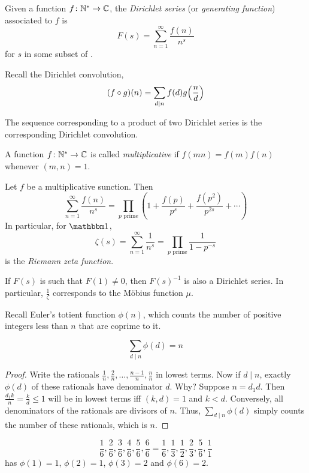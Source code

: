 \begin{definition*} \label{def:dirichlet_series}
    Given a function $f\colon \mathbb{N}^* \to \mathbb{C}$, the \emph{Dirichlet series}
    (or \emph{generating function}) associated to $f$ is \[
        F(s) = \sum_{n=1}^\infty \frac{f(n)}{n^s}
    \] for $s$ in some subset of \C.
\end{definition*}
Recall the Dirichlet convolution, \[
    (f \circ g)(n) = \sum_{d \mid n} f(d)g\paren*[\Big]{\frac{n}{d}}
\]
\begin{exercise}
    The sequence corresponding to a product of two Dirichlet series is the
    corresponding Dirichlet convolution.
\end{exercise}

\begin{definition*}[Multiplicative] \label{def:multiplicative}
    A function $f\colon \mathbb{N}^* \to \mathbb{C}$ is called \emph{multiplicative} if
    $f(mn) = f(m)f(n)$ whenever $(m, n) = 1$.
\end{definition*}
\begin{fact}
    Let $f$ be a multiplicative sunction.
    Then \[
        \sum_{n=1}^\infty \frac{f(n)}{n^s}
        = \prod_{p \text{ prime}} \left(1 + \frac{f(p)}{p^s} + \frac{f(p^2)}{p^{2s}} + \cdots\right)
    \] In particular, for $\mathbbm 1$, \[
        \zeta(s) = \sum_{n=1}^\infty \frac{1}{n^s}
        = \prod_{p \text{ prime}} \frac{1}{1 - p^{-s}}
    \] is the \emph{Riemann zeta function}.
\end{fact}

If $F(s)$ is such that $F(1) \ne 0$, then $F(s)^{-1}$ is also a Dirichlet
series.
In particular, $\frac1{\zeta}$ corresponds to the Möbius function $\mu$.

Recall Euler's totient function $\phi(n)$, which counts the number of
positive integers less than $n$ that are coprime to it.
\begin{proposition*} \label{thm:totient:sum}
    \[
        \sum_{d \mid n} \phi(d) = n
    \]
\end{proposition*}
\begin{proof}
    Write the rationals $\frac1n, \frac{2}{n}, \dots,
    \frac{n-1}{n}, \frac{n}{n}$ in lowest terms.
    Now if $d \mid n$, exactly $\phi(d)$ of these rationals have
    denominator $d$.
    Why? Suppose $n = d_1 d$.
    Then $\frac{d_1 k}{n} = \frac{k}{d} \le 1$ will be in lowest terms iff
    $(k, d) = 1$ and $k < d$.
    Conversely, all denominators of the rationals are divisors of $n$.
    Thus, $\sum_{d \mid n} \phi(d)$ simply counts the number of these
    rationals, which is $n$.
\end{proof}
\begin{example}
    \[
        \frac16, \frac26, \frac36, \frac46, \frac56, \frac66
        = \frac16, \frac13, \frac12, \frac23, \frac56, \frac11
    \] has $\phi(1) = 1$, $\phi(2) = 1$, $\phi(3) = 2$ and $\phi(6) = 2$.
\end{example}

